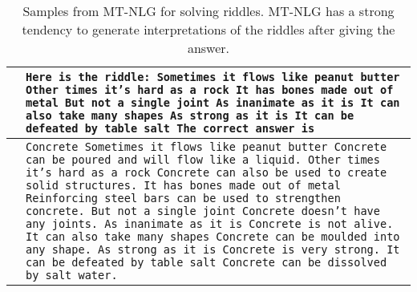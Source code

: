 \documentclass[11pt]{article}
\newcommand{\ours}{MT-NLG}
\begin{document}
\begin{table}[t]
\centering
\small
\begin{tabularx}{\textwidth}{rX}
 \toprule
 \textbf{} & \texttt{Here is the riddle:\newline
Sometimes it flows like peanut butter\newline
Other times it’s hard as a rock\newline
It has bones made out of metal\newline
But not a single joint\newline
As inanimate as it is\newline
It can also take many shapes\newline
As strong as it is\newline
It can be defeated by table salt\newline
The correct answer is}
 \\
 \midrule
\textbf{} &  \texttt{Concrete\newline
Sometimes it flows like peanut butter\newline
Concrete can be poured and will flow like a liquid.\newline
Other times it's hard as a rock\newline
Concrete can also be used to create solid structures.\newline
It has bones made out of metal\newline
Reinforcing steel bars can be used to strengthen concrete.\newline
But not a single joint\newline
Concrete doesn't have any joints.\newline
As inanimate as it is\newline
Concrete is not alive.\newline
It can also take many shapes\newline
Concrete can be moulded into any shape.\newline
As strong as it is\newline
Concrete is very strong.\newline
It can be defeated by table salt\newline
Concrete can be dissolved by salt water.}
 \\
\bottomrule
\end{tabularx}
\caption{Samples from {\ours} for solving riddles. {\ours} has a strong tendency to generate interpretations of the riddles after giving the answer.}
\label{tab:riddles-samples}
\end{table}
\end{document}
